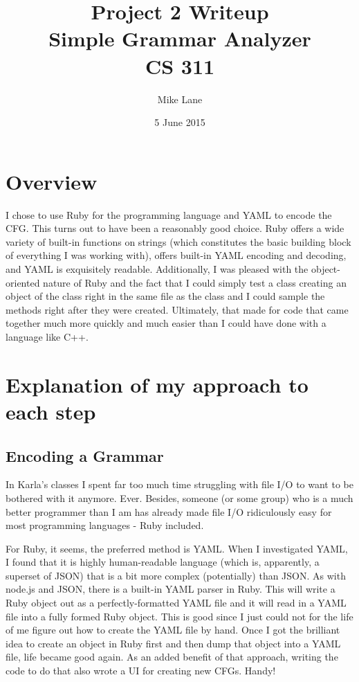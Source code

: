 \documentclass[11pt]{article}
\begin{document}
\setcounter{secnumdepth}{0}

\title{Project 2 Writeup\\Simple Grammar Analyzer\\CS 311}
\author{Mike Lane}
\date{5 June 2015}
\maketitle

\section*{Overview}

I chose to use Ruby for the programming language and YAML to encode the CFG. This turns out to have been a reasonably good choice. Ruby offers a wide variety of built-in functions on strings (which constitutes the basic building block of everything I was working with), offers built-in YAML encoding and decoding, and YAML is exquisitely readable. Additionally, I was pleased with the object-oriented nature of Ruby and the fact that I could simply test a class creating an object of the class right in the same file as the class and I could sample the methods right after they were created. Ultimately, that made for code that came together much more quickly and much easier than I could have done with a language like C++. 

\section*{Explanation of my approach to each step}

\subsection{Encoding a Grammar}
In Karla's classes I spent far too much time struggling with file I/O to want to be bothered with it anymore. Ever. Besides, someone (or some group) who is a much better programmer than I am has already made file I/O ridiculously easy for most programming languages - Ruby included. 

For Ruby, it seems, the preferred method is YAML. When I investigated YAML, I found that it is highly human-readable language (which is, apparently, a superset of JSON) that is a bit more complex (potentially) than JSON. As with node.js and JSON, there is a built-in YAML parser in Ruby. This will write a Ruby object out as a perfectly-formatted YAML file and it will read in a YAML file into a fully formed Ruby object. This is good since I just could not for the life of me figure out how to create the YAML file by hand. Once I got the brilliant idea to create an object in Ruby first and then dump that object into a YAML file, life became good again. As an added benefit of that approach, writing the code to do that also wrote a UI for creating new CFGs. Handy!
\end{document}
